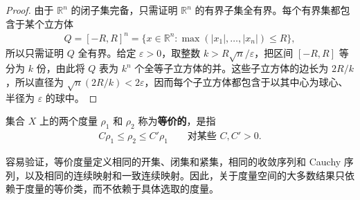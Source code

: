 \documentclass[../../main.tex]{subfiles}%
\begin{document}
\begin{proof}
由于 $\mathbb{R}^n$ 的闭子集完备，只需证明 $\mathbb{R}^n$ 的有界子集全有界。每个有界集都包含于某个立方体
\begin{align*}
Q=[-R,R]^n=\{x\in\mathbb{R}^n:\max(|x_1|,\ldots,|x_n|)\leqslant R\},
\end{align*}
所以只需证明 $Q$ 全有界。给定 $\varepsilon>0$，取整数 $k>R\sqrt{n}/\varepsilon$，把区间 $[-R,R]$ 等分为 $k$ 份，由此将 $Q$ 表为 $k^n$ 个全等子立方体的并。这些子立方体的边长为 $2R/k$，所以直径为 $\sqrt{n}(2R/k)<2\varepsilon$，因而每个子立方体都包含于以其中心为球心、半径为 $\varepsilon$ 的球中。
\end{proof}


\begin{definition}[等价度量]\label{definition:ch00-equivalent-metrics}
集合 $X$ 上的两个度量 $\rho_1$ 和 $\rho_2$ 称为\textbf{等价的}，是指
\begin{align*}
C\rho_1\leqslant\rho_2\leqslant C'\rho_1\qquad\text{对某些 }C,C'>0.
\end{align*}
\end{definition}


\begin{remark}
容易验证，等价度量定义相同的开集、闭集和紧集，相同的收敛序列和 Cauchy 序列，以及相同的连续映射和一致连续映射。因此，关于度量空间的大多数结果只依赖于度量的等价类，而不依赖于具体选取的度量。
\end{remark}
\end{document}
